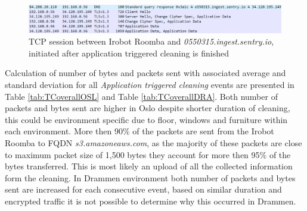 \begin{figure}[H]
    \centering
    \includegraphics[width=\textwidth]{figures/irobot_ATC_DNSimgset.png}
    \caption{TCP session between Irobot Roomba and \textit{0550315.ingest.sentry.io}, initiated after application triggered cleaning is finished}
    \label{fig:ATC_DNS_ingest}
\end{figure}

Calculation of number of bytes and packets sent with associated average and standard deviation for all \textit{Application triggered cleaning} events are presented in Table \ref{tab:TCoverallOSL} and Table \ref{tab:TCoverallDRA}. Both number of packets and bytes sent are higher in Oslo despite shorter duration of cleaning, this could be environment specific due to floor, windows and furniture within each environment. More then 90\% of the packets are sent from the Irobot Roomba to \gls{FQDN} \textit{s3.amazoneaws.com}, as the majority of these packets are close to maximum packet size of 1,500 bytes they account for more then 95\% of the bytes transferred. This is most likely an upload of all the collected information form the cleaning. In Drammen environment both number of packets and bytes sent are increased for each consecutive event, based on similar duration and encrypted traffic it is not possible to determine why this occurred in Drammen. 

